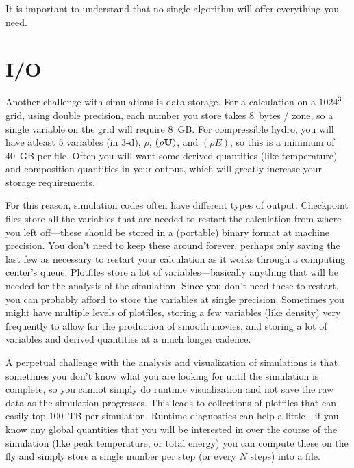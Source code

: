 It is important to understand that no single algorithm will offer everything
you need.


\section{I/O}

Another challenge with simulations is data storage.  For a calculation
on a $1024^3$ grid, using double precision, each number you store
takes 8~bytes / zone, so a single variable on the grid will require
8~GB.  For compressible hydro, you will have atleast 5 variables (in
3-d), $\rho$, $(\rho {\bf U})$, and $(\rho E)$, so this is a minimum of 40~GB per
file.  Often you will want some derived quantities (like temperature)
and composition quantities in your output, which will greatly increase
your storage requirements.

For this reason, simulation codes often have different types of
output.  Checkpoint files store all the variables that are needed to
restart the calculation from where you left off---these should be
stored in a (portable) binary format at machine precision.  You don't
need to keep these around forever, perhaps only saving the last few as
necessary to restart your calculation as it works through a computing
center's queue.  Plotfiles store a lot of variables---basically anything
that will be needed for the analysis of the simulation.  Since you don't
need these to restart, you can probably afford to store the variables
at single precision.  Sometimes you might have multiple levels of plotfiles,
storing a few variables (like density) very frequently to allow for 
the production of smooth movies, and storing a lot of variables and 
derived quantities at a much longer cadence.

A perpetual challenge with the analysis and visualization of
simulations is that sometimes you don't know what you are looking for
until the simulation is complete, so you cannot simply do runtime
visualization and not save the raw data as the simulation progresses.
This leads to collections of plotfiles that can easily top 100~TB per
simulation.  Runtime diagnostics can help a little---if you know any
global quantities that you will be interested in over the course of
the simulation (like peak temperature, or total energy) you can
compute these on the fly and simply store a single number per step (or
every $N$ steps) into a file.
